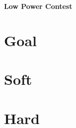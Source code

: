 \documentclass[10pt, english, oneside]{article}
\begin{document}
\begin{center}
  \huge \textbf{Low Power Contest}
\end{center}

\justify

\section{Goal} \label{sec:goal}

\section{Soft} \label{sec:soft}

\section{Hard} \label{sec:hard}
\end{document}
